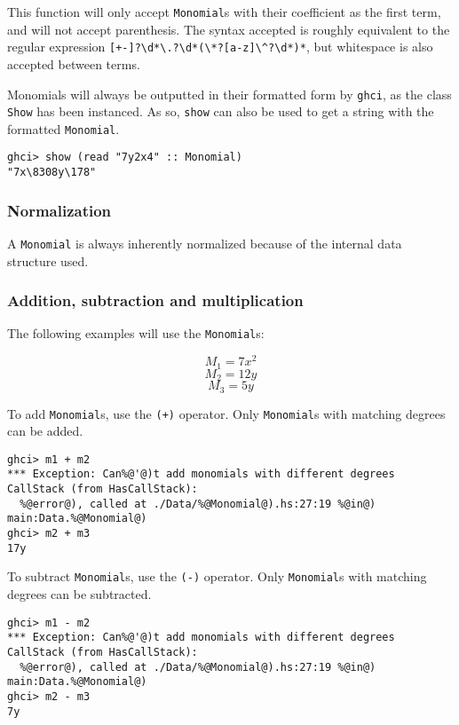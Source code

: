\documentclass[11pt,a4paper]{article}
\begin{document}
This function will only accept \lstinline{Monomial}s with their coefficient as the first term, and will not accept parenthesis.
The syntax accepted is roughly equivalent to the regular expression \lstinline{[+-]?\d*\.?\d*(\*?[a-z]\^?\d*)*}, but whitespace is also accepted between terms.

\vspace{3mm}

Monomials will always be outputted in their formatted form by \lstinline{ghci}, as the class \lstinline{Show} has been instanced.
As so, \lstinline{show} can also be used to get a string with the formatted \lstinline{Monomial}.

\begin{lstlisting}
ghci> show (read "7y2x4" :: Monomial)
"7x\8308y\178"
\end{lstlisting}

\subsubsection{Normalization}

A \lstinline{Monomial} is always inherently normalized because of the internal data structure used.

\subsubsection{Addition, subtraction and multiplication}

The following examples will use the \lstinline{Monomial}s:

$$ M_1 = 7x^2 $$
$$ M_2 = 12y $$
$$ M_3 = 5y $$

To add \lstinline{Monomial}s, use the \lstinline{(+)} operator.
Only \lstinline{Monomial}s with matching degrees can be added.

\begin{lstlisting}
ghci> m1 + m2
*** Exception: Can%@'@)t add monomials with different degrees
CallStack (from HasCallStack):
  %@error@), called at ./Data/%@Monomial@).hs:27:19 %@in@) main:Data.%@Monomial@)
ghci> m2 + m3
17y
\end{lstlisting}

To subtract \lstinline{Monomial}s, use the \lstinline{(-)} operator.
Only \lstinline{Monomial}s with matching degrees can be subtracted.

\begin{lstlisting}
ghci> m1 - m2
*** Exception: Can%@'@)t add monomials with different degrees
CallStack (from HasCallStack):
  %@error@), called at ./Data/%@Monomial@).hs:27:19 %@in@) main:Data.%@Monomial@)
ghci> m2 - m3
7y
\end{lstlisting}
\end{document}
